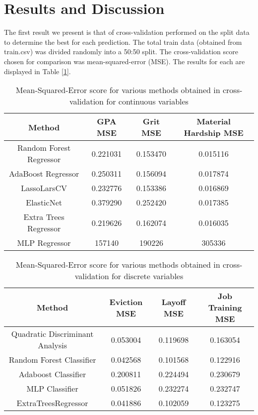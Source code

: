 \section{Results and Discussion}
The first result we present is that of cross-validation performed on the split data to determine the best for each prediction. The total train data (obtained from {\ttfamily train.csv}) was divided randomly into a 50:50 split. The cross-validation score chosen for comparison was mean-squared-error (MSE). The results for each are displayed in Table [\ref{tab:mse_cross_continuous}].
\begin{table}[H]
\centering
	\begin{tabular}{|c|c|c|c|}
	\hline
	Method & GPA MSE & Grit MSE & Material Hardship MSE\\
	\hline
	Random Forest Regressor	&	0.221031	&	0.153470	&	0.015116	\\
	AdaBoost Regressor		&	0.250311	&	0.156094	&	0.017874	\\
	LassoLarsCV				&	0.232776	&	0.153386	&	0.016869	\\
	ElasticNet				&	0.379290	&	0.252420	&	0.017385	\\
	Extra Trees Regressor		&	0.219626	&	0.162074	&	0.016035	\\
	MLP Regressor			&	157140	&	190226	&	305336	\\
	\hline
	\end{tabular}
	\caption{Mean-Squared-Error score for various methods obtained in cross-validation for continuous variables}
	\label{tab:mse_cross_continuous}
\end{table}
\vspace{-10pt}
\begin{table}[H]
\centering
	\begin{tabular}{|c|c|c|c|}
	\hline
	Method & Eviction MSE & Layoff MSE & Job Training MSE\\
	\hline
	Quadratic Discriminant Analysis	&	0.053004	&	0.119698	&	0.163054	\\
	Random Forest Classifier		&	0.042568	&	0.101568	&	0.122916	\\
	Adaboost Classifier				&	0.200811	&	0.224494	&	0.230679	\\
	MLP Classifier				&	0.051826	&	0.232274	&	0.232747	\\
	ExtraTreesRegressor		&	0.041886	&	0.102059	&	0.123275	\\
	\hline
	\end{tabular}
	\caption{Mean-Squared-Error score for various methods obtained in cross-validation for discrete variables}
	\label{tab:mse_cross_discrete}
\end{table}
